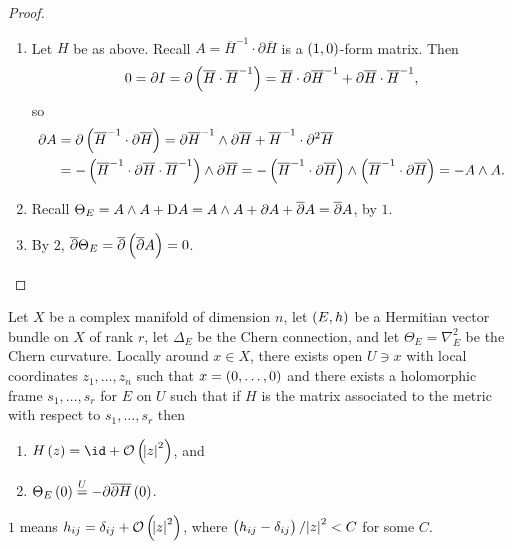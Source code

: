 \begin{proof}
\hfill
\begin{enumerate}
\item Let $ H $ be as above. Recall $ A = \overline{H}^{-1} \cdot \partial\overline{H} $ is a $ \br{1, 0} $-form matrix. Then
$$ 0 = \partial I = \partial\br{\overline{H} \cdot \overline{H}^{-1}} = \overline{H} \cdot \partial\overline{H}^{-1} + \partial\overline{H} \cdot \overline{H}^{-1}, $$
so
\begin{align*}
\partial A
& = \partial\br{\overline{H}^{-1} \cdot \partial\overline{H}}
= \partial\overline{H}^{-1} \wedge \partial\overline{H} + \overline{H}^{-1} \cdot \partial^2\overline{H} \\
& = -\br{\overline{H}^{-1} \cdot \partial\overline{H} \cdot \overline{H}^{-1}} \wedge \partial\overline{H}
= -\br{\overline{H}^{-1} \cdot \partial\overline{H}} \wedge \br{\overline{H}^{-1} \cdot \partial\overline{H}}
= -A \wedge A.
\end{align*}
\item Recall $ \Theta_E = A \wedge A + \mathrm{D} A = A \wedge A + \partial A + \overline{\partial}A = \overline{\partial}A $, by $ 1 $.
\item By $ 2 $, $ \overline{\partial}\Theta_E = \overline{\partial}\br{\overline{\partial}A} = 0 $.
\end{enumerate}
\end{proof}

\begin{lemma}
Let $ X $ be a complex manifold of dimension $ n $, let $ \br{E, h} $ be a Hermitian vector bundle on $ X $ of rank $ r $, let $ \Delta_E $ be the Chern connection, and let $ \Theta_E = \nabla_E^2 $ be the Chern curvature. Locally around $ x \in X $, there exists open $ U \ni x $ with local coordinates $ z_1, \dots, z_n $ such that $ x = \br{0, \dots, 0} $ and there exists a holomorphic frame $ s_1, \dots, s_r $ for $ E $ on $ U $ such that if $ H $ is the matrix associated to the metric with respect to $ s_1, \dots, s_r $ then
\begin{enumerate}
\item $ H\br{z} = \id + \OOO\br{\abs{z}^2} $, and
\item $ \Theta_E\br{0} \overset{U}{=} -\partial\overline{\partial}\overline{H}\br{0} $.
\end{enumerate}
\end{lemma}

$ 1 $ means $ h_{ij} = \delta_{ij} + \OOO\br{\abs{z}^2} $, where $ \br{h_{ij} - \delta_{ij}} / \abs{z}^2 < C $ for some $ C $.

